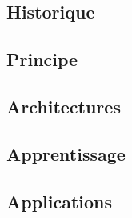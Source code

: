 \subsection{Historique}


\subsection{Principe}


\subsection{Architectures}


\subsection{Apprentissage}


\subsection{Applications}


